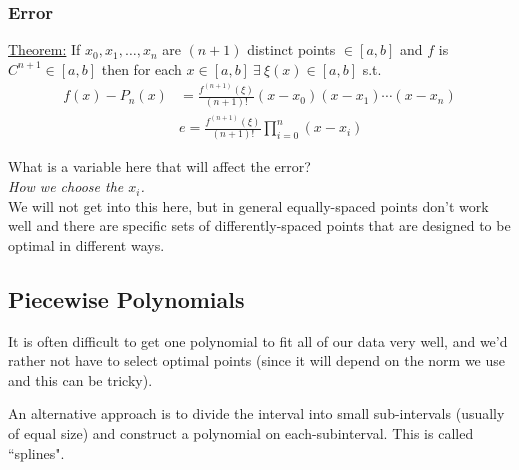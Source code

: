 \documentclass[12pt]{article}
\begin{document}
\subsubsection*{Error}
\underline{Theorem:} If $x_0, x_1,\dots, x_n$ are $(n+1)$ distinct points $\in [a,b]$ and $f$ is $C^{n+1} \in [a,b]$ then for each $x\in [a,b] \: \exists \: \xi(x) \in [a,b]$ s.t.
\begin{align}
f(x) - P_n(x)& = \frac{f^{(n+1)}(\xi)}{(n+1)!}(x-x_0)(x-x_1)\cdots(x-x_n)\nonumber \\
&\boxed{e = \frac{f^{(n+1)}(\xi)}{(n+1)!}\prod_{i=0}^n (x-x_i)}\nonumber
\end{align}
%
%

What is a variable here that will affect the error? \\ \textit{How we choose the $x_i$.} \\We will not get into this here, but in general equally-spaced points don't work well and there are specific sets of differently-spaced points that are designed to be optimal in different ways. 

\subsection*{Piecewise Polynomials}

It is often difficult to get one polynomial to fit all of our data very well, and we'd rather not have to select optimal points (since it will depend on the norm we use and this can be tricky). 

An alternative approach is to divide the interval into small sub-intervals (usually of equal size) and construct a polynomial on each-subinterval. This is called ``splines".
\end{document}
